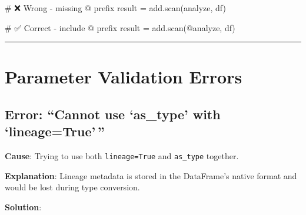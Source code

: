 \documentclass[
  letterpaper,
]{scrbook}
\newenvironment{Shaded}{\begin{snugshade}}{\end{snugshade}}
\newcommand{\CommentTok}[1]{\textcolor[rgb]{0.37,0.37,0.37}{#1}}
\newcommand{\NormalTok}[1]{\textcolor[rgb]{0.00,0.23,0.31}{#1}}
\newcommand{\OperatorTok}[1]{\textcolor[rgb]{0.37,0.37,0.37}{#1}}
\newcommand{\StringTok}[1]{\textcolor[rgb]{0.13,0.47,0.30}{#1}}
\begin{document}
\begin{Shaded}
\begin{Highlighting}[]
\CommentTok{\# ❌ Wrong {-} missing @ prefix}
\NormalTok{result }\OperatorTok{=}\NormalTok{ add.scan(}\StringTok{\textquotesingle{}analyze\textquotesingle{}}\NormalTok{, df)}

\CommentTok{\# ✅ Correct {-} include @ prefix}
\NormalTok{result }\OperatorTok{=}\NormalTok{ add.scan(}\StringTok{\textquotesingle{}@analyze\textquotesingle{}}\NormalTok{, df)}
\end{Highlighting}
\end{Shaded}

\begin{center}\rule{0.5\linewidth}{0.5pt}\end{center}

\section{Parameter Validation Errors}\label{parameter-validation-errors}

\subsection{Error: ``Cannot use `as\_type' with
`lineage=True'\,''}\label{error-cannot-use-as_type-with-lineagetrue}

\textbf{Cause}: Trying to use both \texttt{lineage=True} and
\texttt{as\_type} together.

\textbf{Explanation}: Lineage metadata is stored in the DataFrame's
native format and would be lost during type conversion.

\textbf{Solution}:
\end{document}
